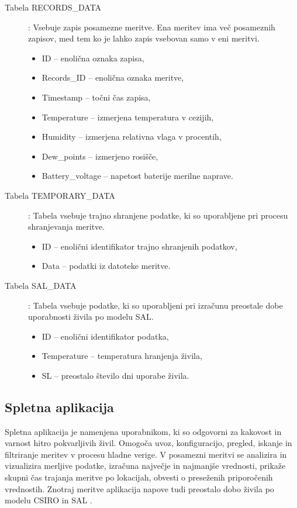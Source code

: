 \documentclass[a4paper, 12pt]{book}
\begin{document}
\begin{description}
\item[Tabela RECORDS\_DATA] : Vsebuje zapis posamezne meritve. Ena meritev ima več posameznih zapisov, med tem ko je lahko zapis vsebovan samo v eni meritvi.
	\begin{itemize}
		\item ID – enolična oznaka zapisa,
		\item Records\_ID – enolična oznaka meritve,
		\item Timestamp – točni čas zapisa,
		\item Temperature – izmerjena temperatura v cezijih,
		\item Humidity – izmerjena relativna vlaga v procentih,
		\item Dew\_points – izmerjeno rosišče,
		\item Battery\_voltage – napetost baterije merilne naprave.
	\end{itemize}
	
\item[Tabela TEMPORARY\_DATA] : Tabela vsebuje trajno shranjene podatke, ki so uporabljene pri procesu shranjevanja meritve.
	\begin{itemize}
		\item ID – enolični identifikator trajno shranjenih podatkov,
		\item Data – podatki iz datoteke meritve.
	\end{itemize}

\item[Tabela SAL\_DATA] : Tabela vsebuje podatke, ki so uporabljeni pri izračunu preostale dobe uporabnosti živila po modelu SAL.
	\begin{itemize}
		\item ID – enolični identifikator podatka,
		\item Temperature – temperatura hranjenja živila,
		\item SL – preostalo število dni uporabe živila.
	\end{itemize}
\end{description}



\subsection{Spletna aplikacija}

Spletna aplikacija je namenjena uporabnikom, ki so odgovorni za kakovost in varnost hitro pokvarljivih živil. Omogoča uvoz, konfiguracijo, pregled, iskanje in filtriranje meritev v procesu hladne verige. V posamezni meritvi se analizira in vizualizira merljive podatke, izračuna največje in najmanjše vrednosti, prikaže skupni čas trajanja meritve po lokacijah, obvesti o preseženih priporočenih vrednostih. Znotraj meritve aplikacija napove tudi preostalo dobo živila po modelu CSIRO \cite{CSIRO-organizacija} in SAL \cite{magistrska-marolt}.
\end{document}
